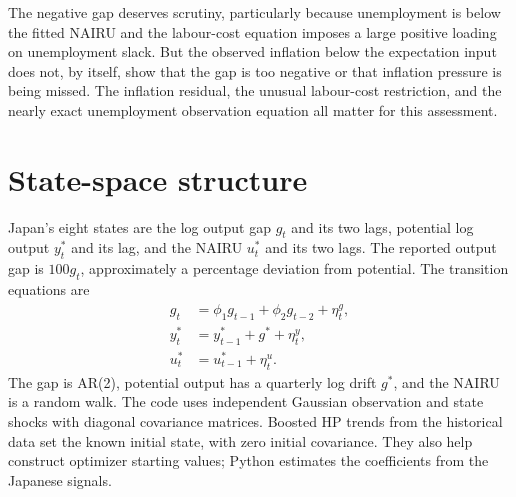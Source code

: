 \documentclass[11pt,a4paper]{article}
\newcommand{\NAIRU}{u^{*}}
\newcommand{\gap}{g}
\begin{document}
The negative gap deserves scrutiny, particularly because unemployment is
below the fitted NAIRU and the labour-cost equation imposes a large positive
loading on unemployment slack. But the observed inflation below the
expectation input does not, by itself, show that the gap is too negative or
that inflation pressure is being missed. The inflation residual, the unusual
labour-cost restriction, and the nearly exact unemployment observation
equation all matter for this assessment.

\section{State-space structure}
Japan's eight states are the log output gap $\gap_t$ and its two lags,
potential log output $y_t^*$ and its lag, and the NAIRU $\NAIRU_t$ and its
two lags. The reported output gap is $100\gap_t$, approximately a percentage
deviation from potential. The transition equations are
\begin{align}
 \gap_t &= \phi_1\gap_{t-1}+\phi_2\gap_{t-2}+\eta^g_t,\\
 y_t^* &= y_{t-1}^*+g^*+\eta^y_t,\\
 \NAIRU_t &= \NAIRU_{t-1}+\eta^u_t.
\end{align}
The gap is AR(2), potential output has a quarterly log drift $g^*$, and the
NAIRU is a random walk. The code uses independent Gaussian observation and
state shocks with diagonal covariance matrices. Boosted HP trends from the
historical data set the known initial state, with zero initial covariance.
They also help construct optimizer starting values; Python estimates the
coefficients from the Japanese signals.
\end{document}
